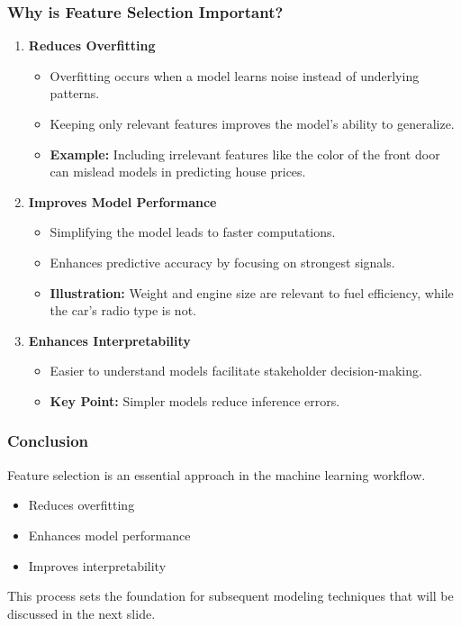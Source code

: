 \documentclass[aspectratio=169]{beamer}
\begin{document}
\begin{frame}[fragile]
    \frametitle{Why is Feature Selection Important?}
    \begin{enumerate}
        \item \textbf{Reduces Overfitting}
        \begin{itemize}
            \item Overfitting occurs when a model learns noise instead of underlying patterns.
            \item Keeping only relevant features improves the model's ability to generalize.
            \item \textbf{Example:} Including irrelevant features like the color of the front door can mislead models in predicting house prices.
        \end{itemize}
        
        \item \textbf{Improves Model Performance}
        \begin{itemize}
            \item Simplifying the model leads to faster computations.
            \item Enhances predictive accuracy by focusing on strongest signals.
            \item \textbf{Illustration:} Weight and engine size are relevant to fuel efficiency, while the car's radio type is not.
        \end{itemize}

        \item \textbf{Enhances Interpretability}
        \begin{itemize}
            \item Easier to understand models facilitate stakeholder decision-making.
            \item \textbf{Key Point:} Simpler models reduce inference errors.
        \end{itemize}
    \end{enumerate}
\end{frame}

\begin{frame}[fragile]
    \frametitle{Conclusion}
    Feature selection is an essential approach in the machine learning workflow. 
    \begin{itemize}
        \item Reduces overfitting
        \item Enhances model performance
        \item Improves interpretability
    \end{itemize}
    This process sets the foundation for subsequent modeling techniques that will be discussed in the next slide.
\end{frame}
\end{document}
